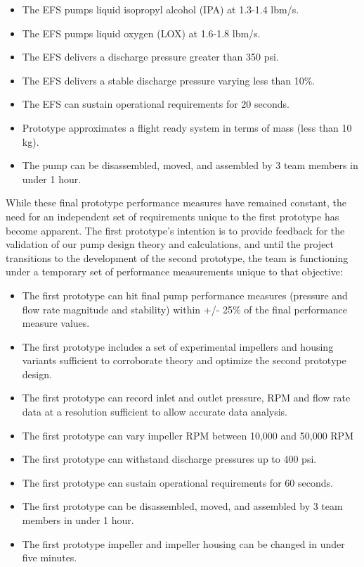\documentclass[11pt,twoside,a4paper,openright]{report}
\begin{document}
\begin{itemize}
\item The EFS pumps liquid isopropyl alcohol (IPA) at 1.3-1.4 lbm/s.
\item The EFS pumps liquid oxygen (LOX) at 1.6-1.8 lbm/s.
\item The EFS delivers a discharge pressure greater than 350 psi.
\item The EFS delivers a stable discharge pressure varying less than 10\%.
\item The EFS can sustain operational requirements for 20 seconds.
\item Prototype approximates a flight ready system in terms of mass (less than 10 kg).
\item The pump can be disassembled, moved, and assembled by 3 team members in under 1 hour. 
\end{itemize}

While these final prototype performance measures have remained constant, the need for an independent set of requirements unique to the first prototype has become apparent. The first prototype’s intention is to provide feedback for the validation of our pump design theory and calculations, and until the project transitions to the development of the second prototype, the team is functioning under a temporary set of performance measurements unique to that objective:\par

\begin{itemize}
\item The first prototype can hit final pump  performance measures (pressure and flow rate magnitude and stability) within +/- 25\% of the final performance measure values. 
\item The first prototype includes a set of experimental impellers and housing variants sufficient to corroborate theory and optimize the second prototype design.
\item The first prototype can record inlet and outlet pressure, RPM and flow rate data at a resolution sufficient to allow accurate data analysis.
\item The first prototype can vary impeller RPM between 10,000 and 50,000 RPM
\item The first prototype can withstand discharge pressures up to 400 psi.
\item The first prototype can sustain operational requirements for 60 seconds.
\item The first prototype can be disassembled, moved, and assembled by 3 team members in under 1 hour. 
\item The first prototype impeller and impeller housing can be changed in under five minutes.
\end{itemize}
\end{document}
